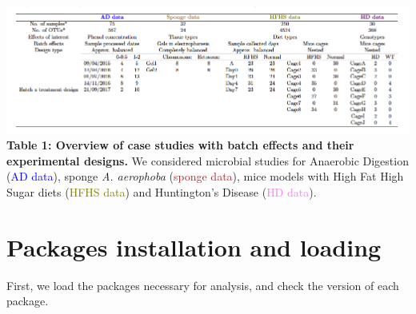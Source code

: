 \documentclass[
]{book}
\begin{document}
\includegraphics{./figures/data_description.png}
\textbf{Table 1: Overview of case studies with batch effects and their experimental designs.} We considered microbial studies for Anaerobic Digestion (\textcolor{blue}{AD data}), sponge \textit{A. aerophoba} (\textcolor{brown}{sponge data}), mice models with High Fat High Sugar diets (\textcolor{olive}{HFHS data}) and Huntington's Disease (\textcolor{violet}{HD data}).

\hypertarget{packages-installation-and-loading}{%
\section{Packages installation and loading}\label{packages-installation-and-loading}}

First, we load the packages necessary for analysis, and check the version of each package.
\end{document}
